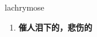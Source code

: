 
\begin{frame}
{\huge lachrymose}
\begin{center}
\begin{enumerate}\Large
  \item \textbf{催人泪下的，悲伤的}
\end{enumerate}
\end{center}
\end{frame}
